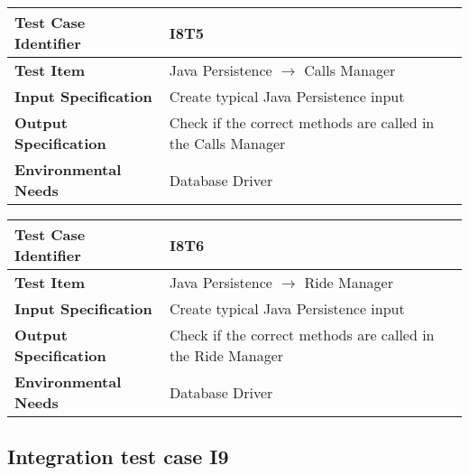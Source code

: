 \begin{table}[!htbp]
\begin{center}
\begin{tabular}[t]{p{}|p{}}

\hline
\textbf{Test Case Identifier} & I8T5 \\
\hline
\textbf{Test Item} & Java Persistence $\rightarrow$ Calls Manager \\
\hline
\textbf{Input Specification} & Create typical Java Persistence input \\
\hline
\textbf{Output Specification} & Check if the correct methods are called in the Calls Manager \\
\hline
\textbf{Environmental Needs} & Database Driver \\
\hline

\end{tabular}
\end{center}
\end{table}

\begin{table}[!htbp]
\begin{center}
\begin{tabular}[t]{p{}|p{}}

\hline
\textbf{Test Case Identifier} & I8T6 \\
\hline
\textbf{Test Item} & Java Persistence $\rightarrow$ Ride Manager \\
\hline
\textbf{Input Specification} & Create typical Java Persistence input \\
\hline
\textbf{Output Specification} & Check if the correct methods are called in the Ride Manager \\
\hline
\textbf{Environmental Needs} & Database Driver \\
\hline

\end{tabular}
\end{center}
\end{table}
\clearpage


\subsection{Integration test case I9}

